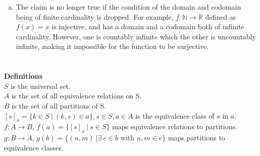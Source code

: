 \documentclass[12pt]{article}
\begin{document}
\begin{enumerate}[(a)]
\begin{enumerate}[(i)]
                        and  are equivalent.
                  \item {\bf Left and right cancellable functions:} If $f$ is left cancellable and right cancellable, it is injective and surjective,
                        which implies $f$ is invertible.
            \end{enumerate}
      \item The claim is no longer true if the condition of the domain and codomain being of
            finite cardinality is dropped. For example, $f:\mathbb{N} \rightarrow \mathbb{R}$
            defined as $f(x) = x$ is injective, and has a domain and a codomain both of infinite
            cardinality. However, one is countably infinite which the other is uncountably
            infinite, making it impossible for the function to be surjective.
\end{enumerate}

\section{}
 {\bf Definitions}\\
$S$ is the universal set.\\
$A$ is the set of all equivalence relations on S.\\
$B$ is the set of all partitions of S.\\
$[s]_a = \{k \in S \ | \ (k, s) \in a\}, s\in S, a \in A$ is the equivalence class of $s$ in $a$.\\
$f:A\rightarrow B$, $f(a) = \{[s]_a\ | \ s \in S\}$ maps equivalence relations to partitions.\\
$g:B\rightarrow A$, $g(b) = \{(n, m)\ | \exists \ e \in b \text{ with } n, m \in e\}$ maps partitions to equivalence classes.
\end{document}
